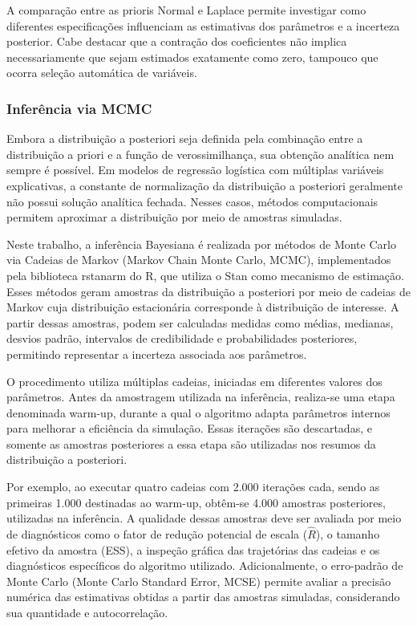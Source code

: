 \documentclass[
  brazilian,
  12pt,
  letterpaper,
  DIV=11,
  numbers=noendperiod]{scrartcl}
\begin{document}
A comparação entre as prioris Normal e Laplace permite investigar como
diferentes especificações influenciam as estimativas dos parâmetros e a
incerteza posterior. Cabe destacar que a contração dos coeficientes não
implica necessariamente que sejam estimados exatamente como zero,
tampouco que ocorra seleção automática de variáveis.

\subsubsection{Inferência via MCMC}\label{inferuxeancia-via-mcmc}

Embora a distribuição a posteriori seja definida pela combinação entre a
distribuição a priori e a função de verossimilhança, sua obtenção
analítica nem sempre é possível. Em modelos de regressão logística com
múltiplas variáveis explicativas, a constante de normalização da
distribuição a posteriori geralmente não possui solução analítica
fechada. Nesses casos, métodos computacionais permitem aproximar a
distribuição por meio de amostras simuladas.

Neste trabalho, a inferência Bayesiana é realizada por métodos de Monte
Carlo via Cadeias de Markov (Markov Chain Monte Carlo, MCMC),
implementados pela biblioteca rstanarm do R, que utiliza o Stan como
mecanismo de estimação. Esses métodos geram amostras da distribuição a
posteriori por meio de cadeias de Markov cuja distribuição estacionária
corresponde à distribuição de interesse. A partir dessas amostras, podem
ser calculadas medidas como médias, medianas, desvios padrão, intervalos
de credibilidade e probabilidades posteriores, permitindo representar a
incerteza associada aos parâmetros.

O procedimento utiliza múltiplas cadeias, iniciadas em diferentes
valores dos parâmetros. Antes da amostragem utilizada na inferência,
realiza-se uma etapa denominada warm-up, durante a qual o algoritmo
adapta parâmetros internos para melhorar a eficiência da simulação.
Essas iterações são descartadas, e somente as amostras posteriores a
essa etapa são utilizadas nos resumos da distribuição a posteriori.

Por exemplo, ao executar quatro cadeias com 2.000 iterações cada, sendo
as primeiras 1.000 destinadas ao warm-up, obtêm-se 4.000 amostras
posteriores, utilizadas na inferência. A qualidade dessas amostras deve
ser avaliada por meio de diagnósticos como o fator de redução potencial
de escala (\(\hat{R}\)), o tamanho efetivo da amostra (ESS), a inspeção
gráfica das trajetórias das cadeias e os diagnósticos específicos do
algoritmo utilizado. Adicionalmente, o erro-padrão de Monte Carlo (Monte
Carlo Standard Error, MCSE) permite avaliar a precisão numérica das
estimativas obtidas a partir das amostras simuladas, considerando sua
quantidade e autocorrelação.
\end{document}
